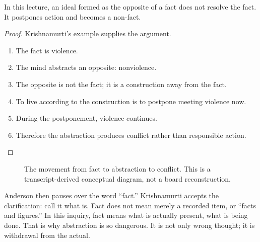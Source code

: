 \begin{proposition}
In this lecture, an ideal formed as the opposite of a fact does not resolve the fact. It postpones action and becomes a non-fact.
\end{proposition}

\begin{proof}
Krishnamurti's example supplies the argument.
\begin{enumerate}
\item The fact is violence.
\item The mind abstracts an opposite: nonviolence.
\item The opposite is not the fact; it is a construction away from the fact.
\item To live according to the construction is to postpone meeting violence now.
\item During the postponement, violence continues.
\item Therefore the abstraction produces conflict rather than responsible action.
\end{enumerate}
\end{proof}

\begin{figure}
\centering
{}
\caption{The movement from fact to abstraction to conflict. This is a transcript-derived conceptual diagram, not a board reconstruction.}
\end{figure}

Anderson then pauses over the word ``fact.'' Krishnamurti accepts the clarification: call it what is. Fact does not mean merely a recorded item, or ``facts and figures.'' In this inquiry, fact means what is actually present, what is being done. That is why abstraction is so dangerous. It is not only wrong thought; it is withdrawal from the actual.

